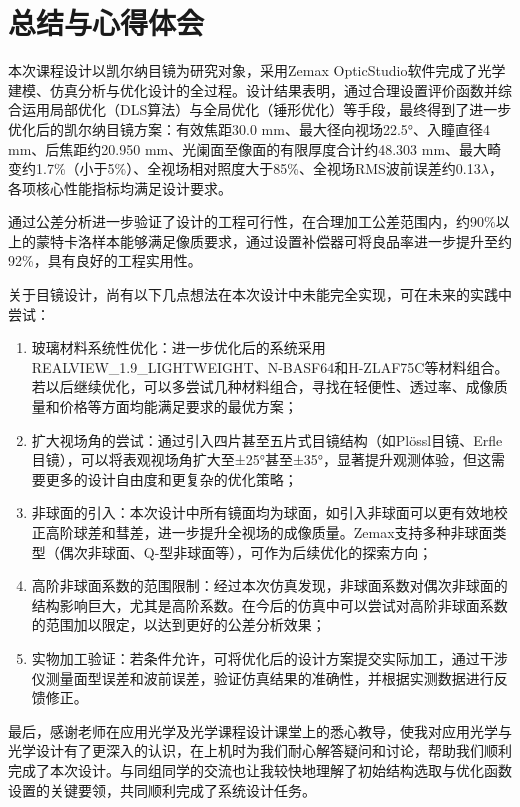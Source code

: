 \section{总结与心得体会}

本次课程设计以凯尔纳目镜为研究对象，采用Zemax OpticStudio软件完成了光学建模、仿真分析与优化设计的全过程。设计结果表明，通过合理设置评价函数并综合运用局部优化（DLS算法）与全局优化（锤形优化）等手段，最终得到了进一步优化后的凯尔纳目镜方案：有效焦距30.0 mm、最大径向视场22.5°、入瞳直径4 mm、后焦距约20.950 mm、光阑面至像面的有限厚度合计约48.303 mm、最大畸变约1.7\%（小于5\%）、全视场相对照度大于85\%、全视场RMS波前误差约0.13\(\lambda\)，各项核心性能指标均满足设计要求。

通过公差分析进一步验证了设计的工程可行性，在合理加工公差范围内，约90\%以上的蒙特卡洛样本能够满足像质要求，通过设置补偿器可将良品率进一步提升至约92\%，具有良好的工程实用性。

关于目镜设计，尚有以下几点想法在本次设计中未能完全实现，可在未来的实践中尝试：

\begin{enumerate}
\def\labelenumi{\arabic{enumi}.}
\item
  玻璃材料系统性优化：进一步优化后的系统采用REALVIEW\_1.9\_LIGHTWEIGHT、N-BASF64和H-ZLAF75C等材料组合。若以后继续优化，可以多尝试几种材料组合，寻找在轻便性、透过率、成像质量和价格等方面均能满足要求的最优方案；
\item
  扩大视场角的尝试：通过引入四片甚至五片式目镜结构（如Plössl目镜、Erfle目镜），可以将表观视场角扩大至±25°甚至±35°，显著提升观测体验，但这需要更多的设计自由度和更复杂的优化策略；
\item
  非球面的引入：本次设计中所有镜面均为球面，如引入非球面可以更有效地校正高阶球差和彗差，进一步提升全视场的成像质量。Zemax支持多种非球面类型（偶次非球面、Q-型非球面等），可作为后续优化的探索方向；
\item
  高阶非球面系数的范围限制：经过本次仿真发现，非球面系数对偶次非球面的结构影响巨大，尤其是高阶系数。在今后的仿真中可以尝试对高阶非球面系数的范围加以限定，以达到更好的公差分析效果；
\item
  实物加工验证：若条件允许，可将优化后的设计方案提交实际加工，通过干涉仪测量面型误差和波前误差，验证仿真结果的准确性，并根据实测数据进行反馈修正。
\end{enumerate}

最后，感谢老师在应用光学及光学课程设计课堂上的悉心教导，使我对应用光学与光学设计有了更深入的认识，在上机时为我们耐心解答疑问和讨论，帮助我们顺利完成了本次设计。与同组同学的交流也让我较快地理解了初始结构选取与优化函数设置的关键要领，共同顺利完成了系统设计任务。
